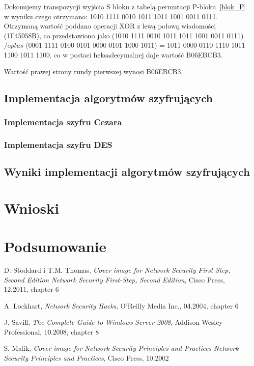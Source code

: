 \documentclass[12p]{article}
\begin{document}
Dokonujemy transpozycji wyjścia S bloku z tabelą permutacji P-bloku~\ref{blok_P} w wyniku czego otrzymano: 1010 1111 0010 1011 1011 1001 0011 0111. Otrzymaną wartość poddano operacji XOR z lewą połową wiadomości (1F45058B), co przedstawiono jako (1010 1111 0010 1011 1011 1001 0011 0111) $/oplus$ (0001 1111 0100 0101 0000 0101 1000 1011) = 1011 0000 0110 1110 1011 1100 1011 1100, co w postaci heksadecymalnej daje wartość B06EBCB3.



Wartość prawej strony rundy pierwszej wynosi B06EBCB3. 

\subsection{Implementacja algorytmów szyfrujących}
\subsubsection{Implementacja szyfru Cezara}
\subsubsection{Implementacja szyfru DES}
\subsection{Wyniki implementacji algorytmów szyfrujących} 
\newpage
\section{Wnioski}
\section{Podsumowanie}
\newpage
\begin{thebibliography}{99}

 D. Stoddard i T.M. Thomas,
\emph{
Cover image for Network Security First-Step, Second Edition
Network Security First-Step, Second Edition},
Cisco Press, 12.2011, chapter 6

 A. Lockhart,
\emph{Network Security Hacks},
O'Reilly Media Inc., 04.2004, chapter 6

 J. Savill,
\emph{The Complete Guide to Windows Server 2008},
Addison-Wesley Professional, 10.2008, chapter 8

 S. Malik,
\emph{Cover image for Network Security Principles and Practices
Network Security Principles and Practices},
Cisco Press, 10.2002




\end{thebibliography}
\newpage
\listoffigures
{}
\end{document}
